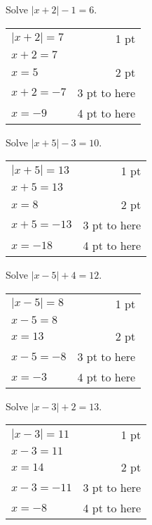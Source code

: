 {
      Solve $\left| x+2 \right | -1=6$.
}
{
	\begin{tabular}{l r}
	$\left| x+2 \right|=7$ & 1 pt\\
	$x+2=7$ & \\
	$x=5$ & 2 pt\\
	$x+2=-7$ & 3 pt to here\\
	$x=-9$ & 4 pt to here
	\end{tabular}
}

{
	Solve $\left| x+5 \right| -3 =10$.
}
{
	\begin{tabular}{l r}
	$\left| x+5 \right| =13$ & 1 pt\\
	$x+5=13$ & \\
	$x=8$ & 2 pt\\
	$x+5=-13$ & 3 pt to here\\
	$x=-18$ & 4 pt to here
	\end{tabular}
}

{
	Solve $\left| x-5 \right| +4 =12$.
}
{
	\begin{tabular}{l r}
	$\left| x-5 \right| =8$ & 1 pt\\
	$x-5=8$ & \\
	$x=13$ & 2 pt\\
	$x-5=-8$ & 3 pt to here\\
	$x=-3$ & 4 pt to here
	\end{tabular}
}

{
	Solve $\left| x-3 \right| +2 =13$.
}
{
	\begin{tabular}{l r}
	$\left| x-3 \right| =11$ & 1 pt\\
	$x-3=11$ & \\
	$x=14$ & 2 pt\\
	$x-3=-11$ & 3 pt to here\\
	$x=-8$ & 4 pt to here
	\end{tabular}
}
